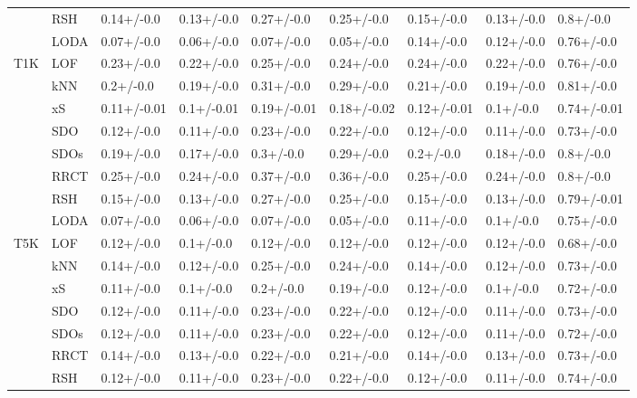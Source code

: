 \begin{table}
\begin{tabular}{lllllllll}
      & RSH &   0.14+/-0.0 &   0.13+/-0.0 &   0.27+/-0.0 &   0.25+/-0.0 &   0.15+/-0.0 &   0.13+/-0.0 &    0.8+/-0.0 \\
      & LODA &   0.07+/-0.0 &   0.06+/-0.0 &   0.07+/-0.0 &   0.05+/-0.0 &   0.14+/-0.0 &   0.12+/-0.0 &   0.76+/-0.0 \\
T1K & LOF &   0.23+/-0.0 &   0.22+/-0.0 &   0.25+/-0.0 &   0.24+/-0.0 &   0.24+/-0.0 &   0.22+/-0.0 &   0.76+/-0.0 \\
      & kNN &    0.2+/-0.0 &   0.19+/-0.0 &   0.31+/-0.0 &   0.29+/-0.0 &   0.21+/-0.0 &   0.19+/-0.0 &   0.81+/-0.0 \\
      & xS &  0.11+/-0.01 &   0.1+/-0.01 &  0.19+/-0.01 &  0.18+/-0.02 &  0.12+/-0.01 &    0.1+/-0.0 &  0.74+/-0.01 \\
      & SDO &   0.12+/-0.0 &   0.11+/-0.0 &   0.23+/-0.0 &   0.22+/-0.0 &   0.12+/-0.0 &   0.11+/-0.0 &   0.73+/-0.0 \\
      & SDOs &   0.19+/-0.0 &   0.17+/-0.0 &    0.3+/-0.0 &   0.29+/-0.0 &    0.2+/-0.0 &   0.18+/-0.0 &    0.8+/-0.0 \\
      & RRCT &   0.25+/-0.0 &   0.24+/-0.0 &   0.37+/-0.0 &   0.36+/-0.0 &   0.25+/-0.0 &   0.24+/-0.0 &    0.8+/-0.0 \\
      & RSH &   0.15+/-0.0 &   0.13+/-0.0 &   0.27+/-0.0 &   0.25+/-0.0 &   0.15+/-0.0 &   0.13+/-0.0 &  0.79+/-0.01 \\
      & LODA &   0.07+/-0.0 &   0.06+/-0.0 &   0.07+/-0.0 &   0.05+/-0.0 &   0.11+/-0.0 &    0.1+/-0.0 &   0.75+/-0.0 \\
T5K & LOF &   0.12+/-0.0 &    0.1+/-0.0 &   0.12+/-0.0 &   0.12+/-0.0 &   0.12+/-0.0 &   0.12+/-0.0 &   0.68+/-0.0 \\
      & kNN &   0.14+/-0.0 &   0.12+/-0.0 &   0.25+/-0.0 &   0.24+/-0.0 &   0.14+/-0.0 &   0.12+/-0.0 &   0.73+/-0.0 \\
      & xS &   0.11+/-0.0 &    0.1+/-0.0 &    0.2+/-0.0 &   0.19+/-0.0 &   0.12+/-0.0 &    0.1+/-0.0 &   0.72+/-0.0 \\
      & SDO &   0.12+/-0.0 &   0.11+/-0.0 &   0.23+/-0.0 &   0.22+/-0.0 &   0.12+/-0.0 &   0.11+/-0.0 &   0.73+/-0.0 \\
      & SDOs &   0.12+/-0.0 &   0.11+/-0.0 &   0.23+/-0.0 &   0.22+/-0.0 &   0.12+/-0.0 &   0.11+/-0.0 &   0.72+/-0.0 \\
      & RRCT &   0.14+/-0.0 &   0.13+/-0.0 &   0.22+/-0.0 &   0.21+/-0.0 &   0.14+/-0.0 &   0.13+/-0.0 &   0.73+/-0.0 \\
      & RSH &   0.12+/-0.0 &   0.11+/-0.0 &   0.23+/-0.0 &   0.22+/-0.0 &   0.12+/-0.0 &   0.11+/-0.0 &   0.74+/-0.0 \\

\end{tabular}
\end{table}
